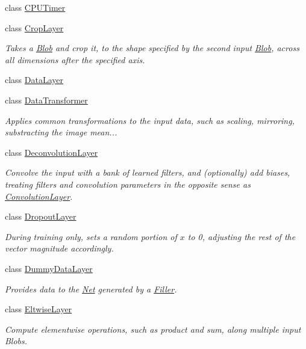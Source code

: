 \begin{DoxyCompactItemize}
class \hyperlink{classcaffe_1_1CPUTimer}{C\+P\+U\+Timer}
\item 
class \hyperlink{classcaffe_1_1CropLayer}{Crop\+Layer}
\begin{DoxyCompactList}\small\item\em Takes a \hyperlink{classcaffe_1_1Blob}{Blob} and crop it, to the shape specified by the second input \hyperlink{classcaffe_1_1Blob}{Blob}, across all dimensions after the specified axis. \end{DoxyCompactList}\item 
class \hyperlink{classcaffe_1_1DataLayer}{Data\+Layer}
\item 
class \hyperlink{classcaffe_1_1DataTransformer}{Data\+Transformer}
\begin{DoxyCompactList}\small\item\em Applies common transformations to the input data, such as scaling, mirroring, substracting the image mean... \end{DoxyCompactList}\item 
class \hyperlink{classcaffe_1_1DeconvolutionLayer}{Deconvolution\+Layer}
\begin{DoxyCompactList}\small\item\em Convolve the input with a bank of learned filters, and (optionally) add biases, treating filters and convolution parameters in the opposite sense as \hyperlink{classcaffe_1_1ConvolutionLayer}{Convolution\+Layer}. \end{DoxyCompactList}\item 
class \hyperlink{classcaffe_1_1DropoutLayer}{Dropout\+Layer}
\begin{DoxyCompactList}\small\item\em During training only, sets a random portion of $x$ to 0, adjusting the rest of the vector magnitude accordingly. \end{DoxyCompactList}\item 
class \hyperlink{classcaffe_1_1DummyDataLayer}{Dummy\+Data\+Layer}
\begin{DoxyCompactList}\small\item\em Provides data to the \hyperlink{classcaffe_1_1Net}{Net} generated by a \hyperlink{classcaffe_1_1Filler}{Filler}. \end{DoxyCompactList}\item 
class \hyperlink{classcaffe_1_1EltwiseLayer}{Eltwise\+Layer}
\begin{DoxyCompactList}\small\item\em Compute elementwise operations, such as product and sum, along multiple input Blobs. \end{DoxyCompactList}\item 

\end{DoxyCompactItemize}
